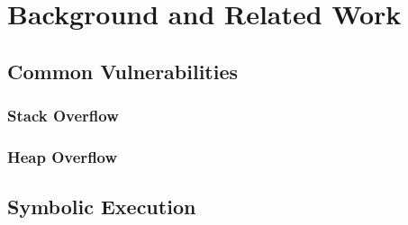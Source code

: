 \chapter{Background and Related Work}

\section{Common Vulnerabilities}
  \subsection{Stack Overflow}
  \subsection{Heap Overflow}

\section{Symbolic Execution}
